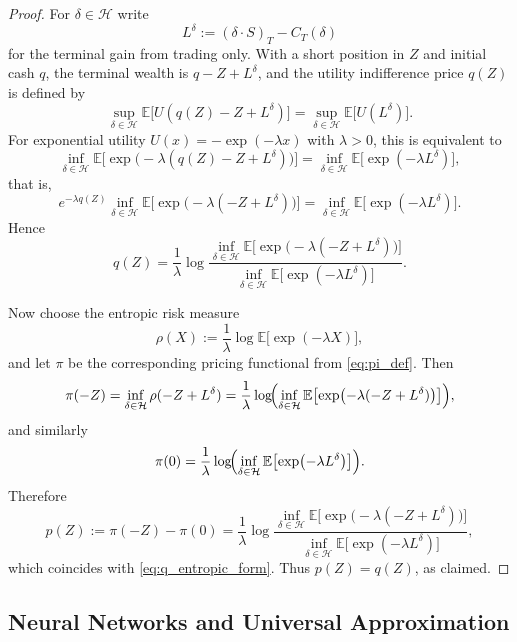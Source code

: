 \documentclass[12pt,a4paper]{article}
\theoremstyle{definition}
\theoremstyle{plain}
\theoremstyle{remark}
\theoremstyle{plain}
\begin{document}
\begin{proof}
For $\delta\in\mathcal H$ write
\[
L^\delta := (\delta\cdot S)_T - C_T(\delta)
\]
for the terminal gain from trading only.  
With a short position in $Z$ and initial cash $q$, the terminal wealth is
$q - Z + L^\delta$, and the utility indifference price $q(Z)$ is defined by
\[
\sup_{\delta\in\mathcal H} \mathbb E\bigl[U(q(Z) - Z + L^\delta)\bigr]
=
\sup_{\delta\in\mathcal H} \mathbb E\bigl[U(L^\delta)\bigr].
\]
For exponential utility $U(x) = -\exp(-\lambda x)$ with $\lambda>0$, this is equivalent to
\[
\inf_{\delta\in\mathcal H} 
\mathbb E\bigl[\exp\bigl(-\lambda(q(Z) - Z + L^\delta)\bigr)\bigr]
=
\inf_{\delta\in\mathcal H} 
\mathbb E\bigl[\exp(-\lambda L^\delta)\bigr],
\]
that is,
\[
e^{-\lambda q(Z)} 
\inf_{\delta\in\mathcal H} 
\mathbb E\bigl[\exp\bigl(-\lambda(-Z + L^\delta)\bigr)\bigr]
=
\inf_{\delta\in\mathcal H} 
\mathbb E\bigl[\exp(-\lambda L^\delta)\bigr].
\]
Hence
\begin{equation}
\label{eq:q_entropic_form}
q(Z)
=
\frac{1}{\lambda}
\log
\frac{
\inf_{\delta\in\mathcal H} 
\mathbb E\bigl[\exp\bigl(-\lambda(-Z + L^\delta)\bigr)\bigr]
}{
\inf_{\delta\in\mathcal H} 
\mathbb E\bigl[\exp(-\lambda L^\delta)\bigr]
}.
\end{equation}

Now choose the entropic risk measure
\[
\rho(X) := \frac{1}{\lambda}\log \mathbb E\bigl[\exp(-\lambda X)\bigr],
\]
and let $\pi$ be the corresponding pricing functional from \eqref{eq:pi_def}. 
Then
\[
\pi(-Z)
= \inf_{\delta\in\mathcal H} \rho(-Z + L^\delta)
= \frac{1}{\lambda}
    \log\!\Bigl(
        \inf_{\delta\in\mathcal H} 
        \mathbb E\bigl[\exp\bigl(-\lambda(-Z + L^\delta)\bigr)\bigr]
      \Bigr),
\]
and similarly
\[
\pi(0)
= \frac{1}{\lambda}
    \log\!\Bigl(
        \inf_{\delta\in\mathcal H} 
        \mathbb E\bigl[\exp(-\lambda L^\delta)\bigr]
      \Bigr).
\]
Therefore
\[
p(Z)
:= \pi(-Z) - \pi(0)
=
\frac{1}{\lambda}
\log
\frac{
\inf_{\delta\in\mathcal H} 
\mathbb E\bigl[\exp\bigl(-\lambda(-Z + L^\delta)\bigr)\bigr]
}{
\inf_{\delta\in\mathcal H} 
\mathbb E\bigl[\exp(-\lambda L^\delta)\bigr]
},
\]
which coincides with \eqref{eq:q_entropic_form}. 
Thus $p(Z)=q(Z)$, as claimed.
\end{proof}

\subsection{Neural Networks and Universal Approximation}
\label{subsec:neural_networks}
\end{document}
